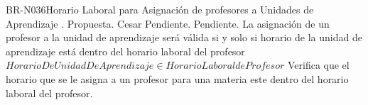 \begin{BusinessRule}{BR-N036}{Horario Laboral para Asignación de profesores a Unidades de Aprendizaje}
	{\bcCondition}    %
	{\btEnabler}     %
	{\blControlling}    %
	.
	\BRItem[Estado] Propuesta.
	 Cesar  
	 Pendiente.
	 Pendiente.
	\BRItem[Descripción] La asignación de un profesor a la unidad de aprendizaje será válida si y solo si horario de la unidad de aprendizaje está dentro del horario laboral del profesor
	\BRItem[Sentencia]  $HorarioDeUnidadDeAprendizaje \in HorarioLaboral de Profesor$
		\BRItem[Motivación] Verifica que el horario que se le asigna a un profesor para una materia este dentro del horario laboral del profesor.
\end{BusinessRule}


